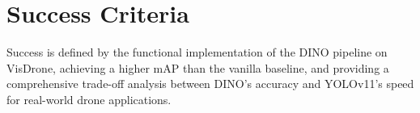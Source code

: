 \documentclass[12pt,a4paper]{article}
\begin{document}
\section{Success Criteria}
Success is defined by the functional implementation of the DINO pipeline on VisDrone, achieving a higher mAP than the vanilla baseline, and providing a comprehensive trade-off analysis between DINO's accuracy and YOLOv11's speed for real-world drone applications.
\end{document}
